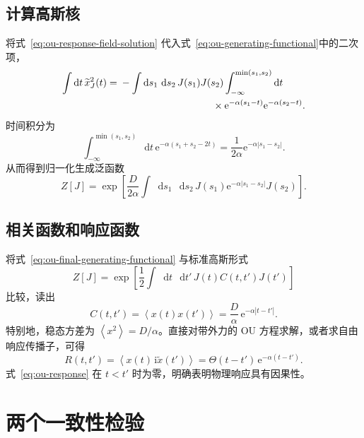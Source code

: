 \documentclass[UTF8,11pt,a4paper]{ctexart}
\newcommand{\dd}{\mathop{}\!\mathrm{d}}
\newcommand{\ii}{\mathrm{i}}
\newcommand{\ee}{\mathrm{e}}
\newcommand{\avg}[1]{\left\langle #1\right\rangle}
\begin{document}
\subsection{计算高斯核}

将式~\eqref{eq:ou-response-field-solution} 代入式~\eqref{eq:ou-generating-functional}中的二次项，
\begin{align}
  \int\dd t\,\widetilde x_J^2(t)
  ={}&-\int\dd s_1\,\dd s_2\,
  J(s_1)J(s_2)
  \int_{-\infty}^{\min(s_1,s_2)}\dd t
  \nonumber\\
  &\hspace{3.3cm}\times
  \ee^{-\alpha(s_1-t)}
  \ee^{-\alpha(s_2-t)}.
  \label{eq:ou-kernel-before-integral}
\end{align}
时间积分为
\begin{equation}
  \int_{-\infty}^{\min(s_1,s_2)}\dd t\,
  \ee^{-\alpha(s_1+s_2-2t)}
  =\frac{1}{2\alpha}
  \ee^{-\alpha|s_1-s_2|}.
  \label{eq:ou-kernel-identity}
\end{equation}
从而得到归一化生成泛函数
\begin{equation}
  \boxed{
  Z[J]
  =\exp\!\left[
  \frac{D}{2\alpha}
  \int\dd s_1\,\dd s_2\,
  J(s_1)\ee^{-\alpha|s_1-s_2|}J(s_2)
  \right].
  }
  \label{eq:ou-final-generating-functional}
\end{equation}

\subsection{相关函数和响应函数}

将式~\eqref{eq:ou-final-generating-functional} 与标准高斯形式
\begin{equation*}
  Z[J]=\exp\!\left[
  \frac12\int\dd t\,\dd t'\,
  J(t)C(t,t')J(t')
  \right]
\end{equation*}
比较，读出
\begin{equation}
  \boxed{
  C(t,t')=\avg{x(t)x(t')}
  =\frac{D}{\alpha}\,
  \ee^{-\alpha|t-t'|}.
  }
  \label{eq:ou-correlation}
\end{equation}
特别地，稳态方差为 $\avg{x^2}=D/\alpha$。直接对带外力的 OU 方程求解，或者求自由响应传播子，可得
\begin{equation}
  \boxed{
  R(t,t')
  =\avg{x(t)\,\ii\widetilde x(t')}
  =\Theta(t-t')\,
  \ee^{-\alpha(t-t')}.
  }
  \label{eq:ou-response}
\end{equation}
式~\eqref{eq:ou-response} 在 $t<t'$ 时为零，明确表明物理响应具有因果性。

\section{两个一致性检验}
\end{document}
